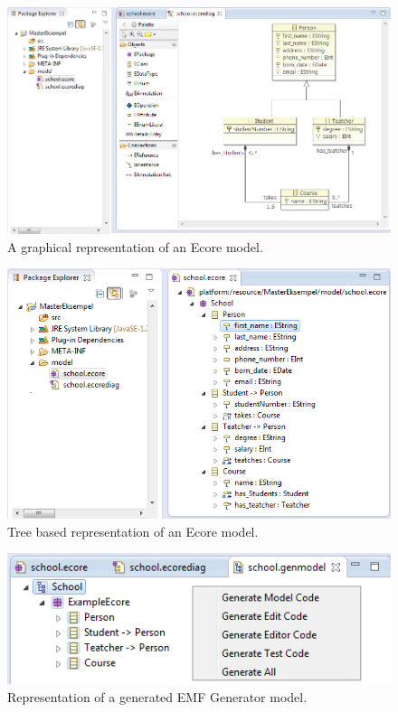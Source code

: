 \begin{figure}[H]
	\centering
	\includegraphics[scale=0.6]{./Figures/EMF_Diagram_Picture.png}
	\caption[Ecore model represented by Ecore Tools]
	{A graphical representation of an Ecore model.}
	\label{fig:EMF_Diagram}
\end{figure}

\begin{figure}[H]
	\centering
	\includegraphics[scale=0.8]{./Figures/EMF_Ecore_Picture.png}
	\caption[Tree based representation of an Ecore model]
	{Tree based representation of an Ecore model.}
	\label{fig:EMF_Ecore}
\end{figure}

\begin{figure}[H]
	\centering
	\includegraphics[scale=0.7]{./Figures/EMF_GenModel.png}
	\caption[Representation of an EMF Generator model]
	{Representation of a generated EMF Generator model.}
	\label{fig:EMF_Ecore}
\end{figure}

